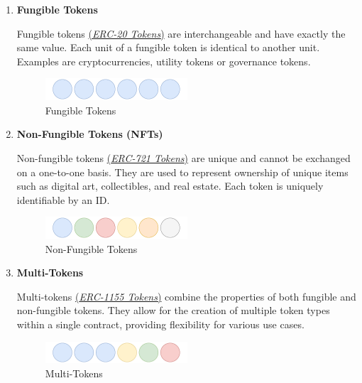 \documentclass[12pt]{article}
\begin{document}
\begin{enumerate}
  \item \textbf{Fungible Tokens}

  Fungible tokens \href{https://ethereum.org/en/developers/docs/standards/tokens/erc-20/}{(\textit{ERC-20 Tokens})} are interchangeable and have exactly the same value. Each unit of a fungible token is identical to another unit. Examples are cryptocurrencies, utility tokens or governance tokens.

    \begin{figure}[h!]
      \centering
      \includegraphics[width=0.5\textwidth]{fungible-tokens.pdf}
      \caption{Fungible Tokens}
      \label{fig:fungible-tokens}
    \end{figure}

    \item \textbf{Non-Fungible Tokens (NFTs)}

    Non-fungible tokens \href{https://ethereum.org/en/developers/docs/standards/tokens/erc-721/}{(\textit{ERC-721 Tokens})} are unique and cannot be exchanged on a one-to-one basis. They are used to represent ownership of unique items such as digital art, collectibles, and real estate. Each token is uniquely identifiable by an ID.

    \begin{figure}[h!]
      \centering
      \includegraphics[width=0.5\textwidth]{non-fungible-tokens.pdf}
      \caption{Non-Fungible Tokens}
      \label{fig:non-fungible-tokens}
    \end{figure}

    \item \textbf{Multi-Tokens}

    Multi-tokens \href{https://ethereum.org/en/developers/docs/standards/tokens/erc-1155/}{(\textit{ERC-1155 Tokens})} combine the properties of both fungible and non-fungible tokens. They allow for the creation of multiple token types within a single contract, providing flexibility for various use cases.

    \begin{figure}[h!]
      \centering
      \includegraphics[width=0.5\textwidth]{multi-token.pdf}
      \caption{Multi-Tokens}
      \label{fig:multi-token}
    \end{figure}
  \end{enumerate}
\end{document}
